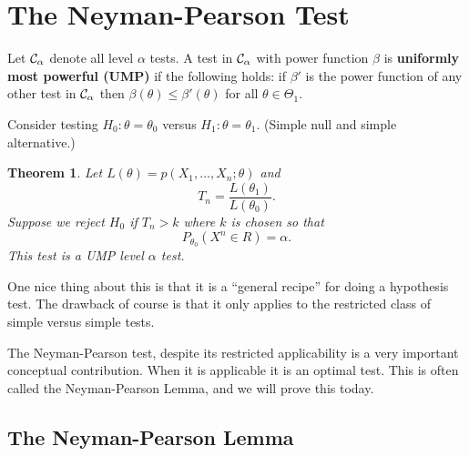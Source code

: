 \documentclass[twoside,12pt]{article}
\newcounter{lecnum}
\newtheorem{theorem}{Theorem}[lecnum]
\begin{document}
\section{The Neyman-Pearson Test}
Let ${\cal C}_\alpha$ denote all level $\alpha$ tests.
A test in ${\cal C}_\alpha$ with power function $\beta$ is
{\bf uniformly most powerful (UMP)} if the following holds:
if $\beta'$ is the power function of any other test in ${\cal C}_\alpha$ then
$\beta(\theta) \leq \beta'(\theta)$ for all $\theta\in\Theta_1$.

Consider testing
$H_0: \theta = \theta_0$ versus
$H_1: \theta = \theta_1$.
(Simple null and simple alternative.)

\begin{theorem}
Let
$L(\theta) = p(X_1,\ldots, X_n;\theta)$
and
$$
T_n = \frac{L(\theta_1)}{L(\theta_0)}.
$$
Suppose we reject $H_0$ if
$T_n > k$ 
where $k$ is chosen so that
$$
P_{\theta_0}(X^n \in R) = \alpha.
$$
This test is a UMP level $\alpha$ test.
\end{theorem}

%
%

One nice thing about this is that it is a ``general recipe'' for doing a hypothesis test. The drawback
of course is that it only applies to the restricted class of simple versus simple tests.

The Neyman-Pearson test, despite its restricted applicability is a very important conceptual contribution. When it is applicable it is an optimal test. This is often called the Neyman-Pearson Lemma,
and we will prove this today.

\subsection{The Neyman-Pearson Lemma}
\end{document}
